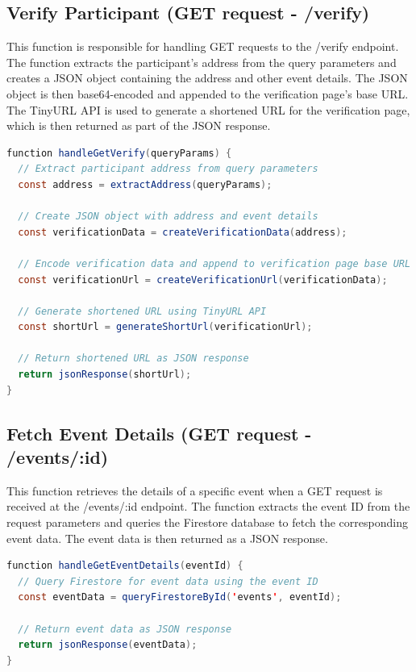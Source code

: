 \subsection{Verify Participant (GET request - /verify)}
This function is responsible for handling GET requests to the /verify endpoint. The function extracts the participant's address from the query parameters and creates a JSON object containing the address and other event details. The JSON object is then base64-encoded and appended to the verification page's base URL. The TinyURL API is used to generate a shortened URL for the verification page, which is then returned as part of the JSON response.

\begin{lstlisting}[language=Java, name={Verify Participant Function}, label={sc:verifyParticipant}]
function handleGetVerify(queryParams) {
  // Extract participant address from query parameters
  const address = extractAddress(queryParams);

  // Create JSON object with address and event details
  const verificationData = createVerificationData(address);

  // Encode verification data and append to verification page base URL
  const verificationUrl = createVerificationUrl(verificationData);

  // Generate shortened URL using TinyURL API
  const shortUrl = generateShortUrl(verificationUrl);

  // Return shortened URL as JSON response
  return jsonResponse(shortUrl);
}
\end{lstlisting}

\subsection{Fetch Event Details (GET request - /events/:id)}
This function retrieves the details of a specific event when a GET request is received at the /events/:id endpoint. The function extracts the event ID from the request parameters and queries the Firestore database to fetch the corresponding event data. The event data is then returned as a JSON response.

\begin{lstlisting}[language=Java, name={Fetch Event Details Function}, label={sc:fetchEventDetails}]
function handleGetEventDetails(eventId) {
  // Query Firestore for event data using the event ID
  const eventData = queryFirestoreById('events', eventId);

  // Return event data as JSON response
  return jsonResponse(eventData);
}
\end{lstlisting}

